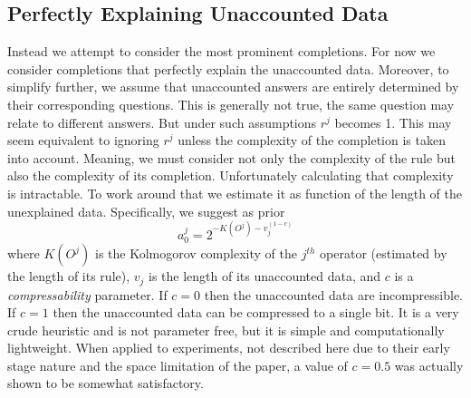 \documentclass[runningheads]{llncs}
\begin{document}
\subsection{Perfectly Explaining Unaccounted Data}
Instead we attempt to consider the most prominent completions.  For
now we consider completions that perfectly explain the unaccounted
data. Moreover, to simplify further, we assume that unaccounted
answers are entirely determined by their corresponding questions. This
is generally not true, the same question may relate to different
answers. But under such assumptions $r^j$ becomes 1. This may seem
equivalent to ignoring $r^j$ unless the complexity of the completion
is taken into account. Meaning, we must consider not only the
complexity of the rule but also the complexity of its
completion. Unfortunately calculating that complexity is
intractable. To work around that we estimate it as function of the
length of the unexplained data. Specifically, we suggest as prior
\begin{equation}
a^j_0 = 2^{-K(O^j) - v_j^{(1-c)}}
\end{equation}
where $K(O^j)$ is the Kolmogorov complexity of the $j^{th}$ operator
(estimated by the length of its rule), $v_j$ is the length of its
unaccounted data, and $c$ is a \emph{compressability} parameter. If
$c=0$ then the unaccounted data are incompressible. If $c=1$ then the
unaccounted data can be compressed to a single bit. It is a very crude
heuristic and is not parameter free, but it is simple and
computationally lightweight. When applied to experiments, not
described here due to their early stage nature and the space
limitation of the paper, a value of $c=0.5$ was actually shown to be
somewhat satisfactory.
\end{document}
